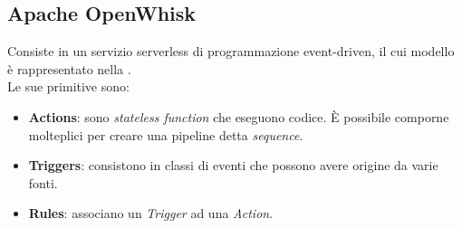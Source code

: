 \documentclass[12pt,a4paper,openany,twoside]{book}
\begin{document}
\subsection{Apache OpenWhisk}

Consiste in un servizio serverless di programmazione event-driven, il cui modello è rappresentato nella .
\\
Le sue primitive sono:
\begin{itemize}
    \item \textbf{Actions}: sono \textit{stateless function} che eseguono codice. È possibile comporne molteplici per creare una pipeline detta \textit{sequence}.
    
    \item \textbf{Triggers}: consistono in classi di eventi che possono avere origine da varie fonti.
    
    \item \textbf{Rules}: associano un \textit{Trigger} ad una \textit{Action}.
\end{itemize}
\end{document}
